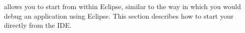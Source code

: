
\app{} allows you to start \gdauts{} from within Eclipse, similar to the way 
in which you would debug an application using Eclipse. This section describes how
to start your \gdaut{} directly from the IDE. 
